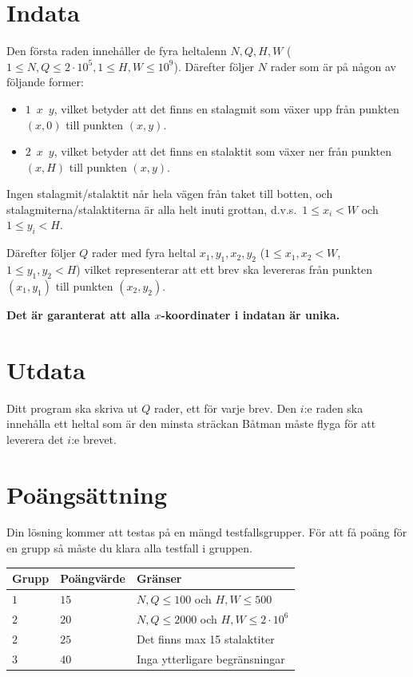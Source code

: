 \section*{Indata}
Den första raden innehåller de fyra heltalenn $N,Q,H,W$ ($1 \leq N, Q \leq 2 \cdot 10^5, 1 \leq H,W \leq 10^9$).
Därefter följer $N$ rader som är på någon av följande former:
\begin{itemize}
  \item $1\enspace x\enspace y$, vilket betyder att det finns en stalagmit
    som växer upp från punkten $(x,0)$ till punkten $(x,y)$.
  \item $2\enspace x\enspace y$, vilket betyder att det finns en stalaktit
    som växer ner från punkten $(x,H)$ till punkten $(x,y)$.
\end{itemize}
Ingen stalagmit/stalaktit når hela vägen från taket till botten,
och stalagmiterna/stalaktiterna är alla helt inuti grottan,
d.v.s.\ $1\le x_{i} < W$ och $1\le y_{i} < H$.

Därefter följer $Q$ rader med fyra heltal
$x_{1},y_{1},x_{2},y_{2}$ ($1\le x_{1},x_{2} < W$, $1\le y_{1},y_{2}< H$) vilket representerar att ett brev ska levereras från
punkten $(x_{1},y_{1})$ till punkten $(x_{2},y_{2})$.

\textbf{Det är garanterat att alla $x$-koordinater i indatan är unika.}

\section*{Utdata}
Ditt program ska skriva ut $Q$ rader, ett för varje brev.
Den $i$:e raden ska innehålla ett heltal som är den minsta
sträckan Båtman måste flyga för att leverera det $i$:e brevet.

\section*{Poängsättning}
Din lösning kommer att testas på en mängd testfallsgrupper.
För att få poäng för en grupp så måste du klara alla testfall i gruppen.

\noindent
\begin{tabular}{| l | l | l |}
\hline
Grupp & Poängvärde & Gränser \\ \hline
$1$    & $15$         & $N,Q\le 100$ och $H,W\le 500$ \\ \hline
$2$    & $20$         & $N,Q \le 2000$ och $H,W\le 2\cdot 10^6$\\ \hline
$2$    & $25$         & Det finns max 15 stalaktiter \\ \hline
$3$    & $40$         & Inga ytterligare begränsningar \\ \hline
\end{tabular}
